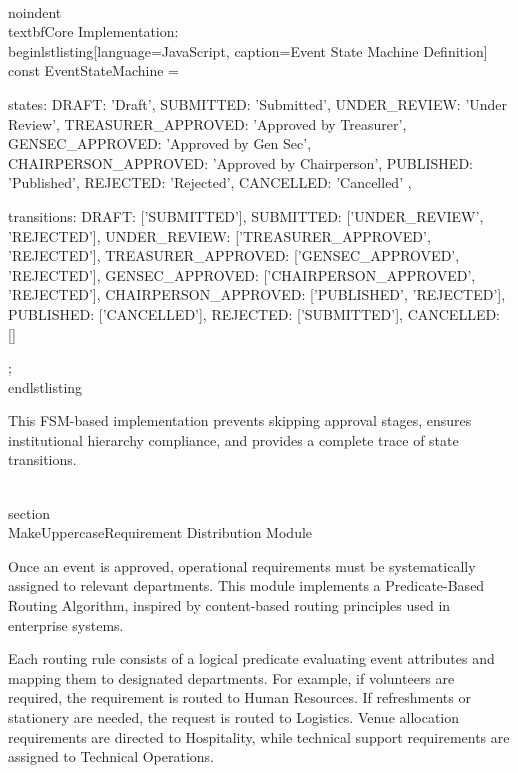 \\noindent\\textbf{Core Implementation:}
\\begin{lstlisting}[language=JavaScript, caption=Event State Machine Definition]
const EventStateMachine = {
  states: {
    DRAFT: 'Draft',
    SUBMITTED: 'Submitted',
    UNDER_REVIEW: 'Under Review',
    TREASURER_APPROVED: 'Approved by Treasurer',
    GENSEC_APPROVED: 'Approved by Gen Sec',
    CHAIRPERSON_APPROVED: 'Approved by Chairperson',
    PUBLISHED: 'Published',
    REJECTED: 'Rejected',
    CANCELLED: 'Cancelled'
  },

  transitions: {
    DRAFT: ['SUBMITTED'],
    SUBMITTED: ['UNDER_REVIEW', 'REJECTED'],
    UNDER_REVIEW: ['TREASURER_APPROVED', 'REJECTED'],
    TREASURER_APPROVED: ['GENSEC_APPROVED', 'REJECTED'],
    GENSEC_APPROVED: ['CHAIRPERSON_APPROVED', 'REJECTED'],
    CHAIRPERSON_APPROVED: ['PUBLISHED', 'REJECTED'],
    PUBLISHED: ['CANCELLED'],
    REJECTED: ['SUBMITTED'],
    CANCELLED: []
  }
};
\\end{lstlisting}

This FSM-based implementation prevents skipping approval stages, ensures institutional hierarchy compliance, and provides a complete trace of state transitions.

\\section{\\MakeUppercase{Requirement Distribution Module}}

Once an event is approved, operational requirements must be systematically assigned to relevant departments. This module implements a Predicate-Based Routing Algorithm, inspired by content-based routing principles used in enterprise systems.

Each routing rule consists of a logical predicate evaluating event attributes and mapping them to designated departments. For example, if volunteers are required, the requirement is routed to Human Resources. If refreshments or stationery are needed, the request is routed to Logistics. Venue allocation requirements are directed to Hospitality, while technical support requirements are assigned to Technical Operations.

